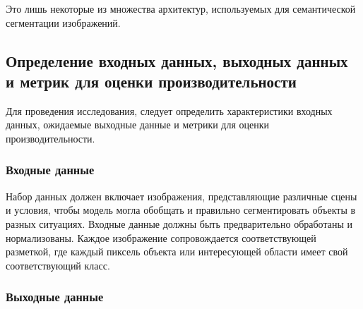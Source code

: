 \documentclass[11pt]{article}
\begin{document}
Это лишь некоторые из множества архитектур, используемых для
семантической сегментации изображений.

    \hypertarget{ux43eux43fux440ux435ux434ux435ux43bux435ux43dux438ux435-ux432ux445ux43eux434ux43dux44bux445-ux434ux430ux43dux43dux44bux445-ux432ux44bux445ux43eux434ux43dux44bux445-ux434ux430ux43dux43dux44bux445-ux438-ux43cux435ux442ux440ux438ux43a-ux434ux43bux44f-ux43eux446ux435ux43dux43aux438-ux43fux440ux43eux438ux437ux432ux43eux434ux438ux442ux435ux43bux44cux43dux43eux441ux442ux438}{%
\subsection{Определение входных данных, выходных данных и метрик для
оценки
производительности}\label{ux43eux43fux440ux435ux434ux435ux43bux435ux43dux438ux435-ux432ux445ux43eux434ux43dux44bux445-ux434ux430ux43dux43dux44bux445-ux432ux44bux445ux43eux434ux43dux44bux445-ux434ux430ux43dux43dux44bux445-ux438-ux43cux435ux442ux440ux438ux43a-ux434ux43bux44f-ux43eux446ux435ux43dux43aux438-ux43fux440ux43eux438ux437ux432ux43eux434ux438ux442ux435ux43bux44cux43dux43eux441ux442ux438}}

    Для проведения исследования, следует определить характеристики входных
данных, ожидаемые выходные данные и метрики для оценки
производительности.

\hypertarget{ux432ux445ux43eux434ux43dux44bux435-ux434ux430ux43dux43dux44bux435}{%
\subsubsection{Входные
данные}\label{ux432ux445ux43eux434ux43dux44bux435-ux434ux430ux43dux43dux44bux435}}

Набор данных должен включает изображения, представляющие различные сцены
и условия, чтобы модель могла обобщать и правильно сегментировать
объекты в разных ситуациях. Входные данные должны быть предварительно
обработаны и нормализованы. Каждое изображение сопровождается
соответствующей разметкой, где каждый пиксель объекта или интересующей
области имеет свой соответствующий класс.

\hypertarget{ux432ux44bux445ux43eux434ux43dux44bux435-ux434ux430ux43dux43dux44bux435}{%
\subsubsection{Выходные
данные}\label{ux432ux44bux445ux43eux434ux43dux44bux435-ux434ux430ux43dux43dux44bux435}}
\end{document}
